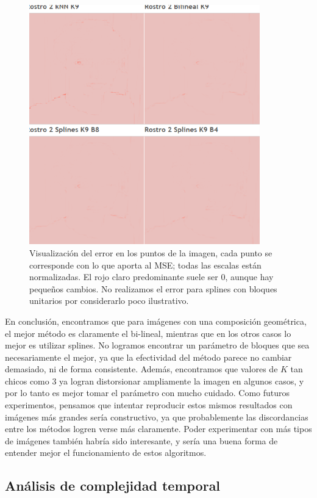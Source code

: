 \documentclass{article}
\begin{document}
\begin{figure}[H]
\centering
\includegraphics[width=10cm]{Error Rostro 2}
\caption{Visualización del error en los puntos de la imagen, cada punto se corresponde con lo que aporta al MSE; todas las escalas están normalizadas. El rojo claro predominante suele ser 0, aunque hay pequeños cambios. No realizamos el error para splines con bloques unitarios por considerarlo poco ilustrativo.}
\label{fig:error_rostro_2}
\end{figure}

En conclusión, encontramos que para imágenes con una composición geométrica, el mejor método es claramente el bi-lineal, mientras que en los otros casos lo mejor es utilizar splines. No logramos encontrar un parámetro de bloques que sea necesariamente el mejor, ya que la efectividad del método parece no cambiar demasiado, ni de forma consistente. Además, encontramos que valores de $K$ tan chicos como $3$ ya logran distorsionar ampliamente la imagen en algunos casos, y por lo tanto es mejor tomar el parámetro con mucho cuidado. Como futuros experimentos, pensamos que intentar reproducir estos mismos resultados con imágenes más grandes sería constructivo, ya que probablemente las discordancias entre los métodos logren verse más claramente. Poder experimentar con más tipos de imágenes también habría sido interesante, y sería una buena forma de entender mejor el funcionamiento de estos algoritmos.

\subsection{Análisis de complejidad temporal}
\end{document}
